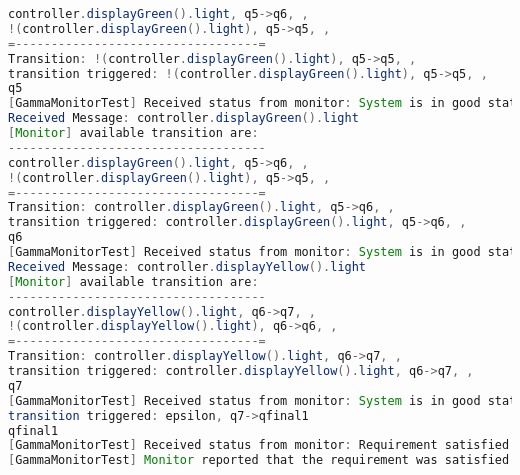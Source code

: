 \begin{lstlisting}[language=java, frame=single, float=ht!, caption={Szenárió szöveges leírása.},captionpos=b]
controller.displayGreen().light, q5->q6, ,
!(controller.displayGreen().light), q5->q5, ,
=----------------------------------=
Transition: !(controller.displayGreen().light), q5->q5, ,
transition triggered: !(controller.displayGreen().light), q5->q5, ,
q5
[GammaMonitorTest] Received status from monitor: System is in good state.
Received Message: controller.displayGreen().light
[Monitor] available transition are:
------------------------------------
controller.displayGreen().light, q5->q6, ,
!(controller.displayGreen().light), q5->q5, ,
=----------------------------------=
Transition: controller.displayGreen().light, q5->q6, ,
transition triggered: controller.displayGreen().light, q5->q6, ,
q6
[GammaMonitorTest] Received status from monitor: System is in good state.
Received Message: controller.displayYellow().light
[Monitor] available transition are:
------------------------------------
controller.displayYellow().light, q6->q7, ,
!(controller.displayYellow().light), q6->q6, ,
=----------------------------------=
Transition: controller.displayYellow().light, q6->q7, ,
transition triggered: controller.displayYellow().light, q6->q7, ,
q7
[GammaMonitorTest] Received status from monitor: System is in good state.
transition triggered: epsilon, q7->qfinal1
qfinal1
[GammaMonitorTest] Received status from monitor: Requirement satisfied
[GammaMonitorTest] Monitor reported that the requirement was satisfied
\end{lstlisting}